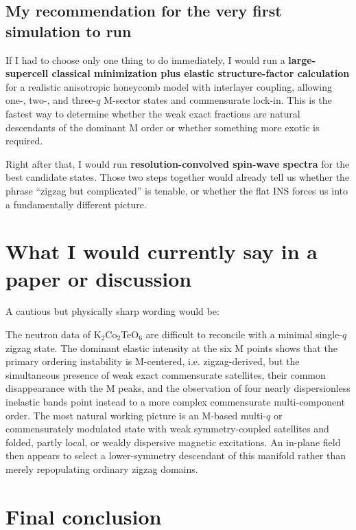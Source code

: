 \documentclass[11pt]{article}
\begin{document}
\subsection{My recommendation for the very first simulation to run}

If I had to choose only one thing to do immediately, I would run a \textbf{large-supercell classical minimization plus elastic structure-factor calculation} for a realistic anisotropic honeycomb model with interlayer coupling, allowing one-, two-, and three-$q$ M-sector states and commensurate lock-in. This is the fastest way to determine whether the weak exact fractions are natural descendants of the dominant M order or whether something more exotic is required.

Right after that, I would run \textbf{resolution-convolved spin-wave spectra} for the best candidate states. Those two steps together would already tell us whether the phrase ``zigzag but complicated'' is tenable, or whether the flat INS forces us into a fundamentally different picture.

\section{What I would currently say in a paper or discussion}

A cautious but physically sharp wording would be:

\begin{framed}
The neutron data of K$_2$Co$_2$TeO$_6$ are difficult to reconcile with a minimal single-$q$ zigzag state. The dominant elastic intensity at the six M points shows that the primary ordering instability is M-centered, i.e. zigzag-derived, but the simultaneous presence of weak exact commensurate satellites, their common disappearance with the M peaks, and the observation of four nearly dispersionless inelastic bands point instead to a more complex commensurate multi-component order. The most natural working picture is an M-based multi-$q$ or commensurately modulated state with weak symmetry-coupled satellites and folded, partly local, or weakly dispersive magnetic excitations. An in-plane field then appears to select a lower-symmetry descendant of this manifold rather than merely repopulating ordinary zigzag domains.
\end{framed}

\section{Final conclusion}
\end{document}
